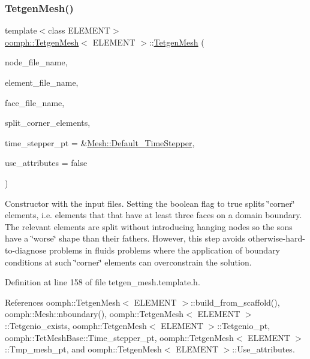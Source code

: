 \subsubsection{\texorpdfstring{Tetgen\+Mesh()}{TetgenMesh()}\hspace{0.1cm}{\footnotesize\ttfamily [4/6]}}
{\footnotesize\ttfamily template$<$class E\+L\+E\+M\+E\+NT$>$ \\
\hyperlink{classoomph_1_1TetgenMesh}{oomph\+::\+Tetgen\+Mesh}$<$ E\+L\+E\+M\+E\+NT $>$\+::\hyperlink{classoomph_1_1TetgenMesh}{Tetgen\+Mesh} (\begin{DoxyParamCaption}\item[{const std\+::string \&}]{node\+\_\+file\+\_\+name,  }\item[{const std\+::string \&}]{element\+\_\+file\+\_\+name,  }\item[{const std\+::string \&}]{face\+\_\+file\+\_\+name,  }\item[{const bool \&}]{split\+\_\+corner\+\_\+elements,  }\item[{\hyperlink{classoomph_1_1TimeStepper}{Time\+Stepper} $\ast$}]{time\+\_\+stepper\+\_\+pt = {\ttfamily \&\hyperlink{classoomph_1_1Mesh_a12243d0fee2b1fcee729ee5a4777ea10}{Mesh\+::\+Default\+\_\+\+Time\+Stepper}},  }\item[{const bool \&}]{use\+\_\+attributes = {\ttfamily false} }\end{DoxyParamCaption})\hspace{0.3cm}{\ttfamily [inline]}}



Constructor with the input files. Setting the boolean flag to true splits \char`\"{}corner\char`\"{} elements, i.\+e. elements that that have at least three faces on a domain boundary. The relevant elements are split without introducing hanging nodes so the sons have a \char`\"{}worse\char`\"{} shape than their fathers. However, this step avoids otherwise-\/hard-\/to-\/diagnose problems in fluids problems where the application of boundary conditions at such \char`\"{}corner\char`\"{} elements can overconstrain the solution. 



Definition at line 158 of file tetgen\+\_\+mesh.\+template.\+h.



References oomph\+::\+Tetgen\+Mesh$<$ E\+L\+E\+M\+E\+N\+T $>$\+::build\+\_\+from\+\_\+scaffold(), oomph\+::\+Mesh\+::nboundary(), oomph\+::\+Tetgen\+Mesh$<$ E\+L\+E\+M\+E\+N\+T $>$\+::\+Tetgenio\+\_\+exists, oomph\+::\+Tetgen\+Mesh$<$ E\+L\+E\+M\+E\+N\+T $>$\+::\+Tetgenio\+\_\+pt, oomph\+::\+Tet\+Mesh\+Base\+::\+Time\+\_\+stepper\+\_\+pt, oomph\+::\+Tetgen\+Mesh$<$ E\+L\+E\+M\+E\+N\+T $>$\+::\+Tmp\+\_\+mesh\+\_\+pt, and oomph\+::\+Tetgen\+Mesh$<$ E\+L\+E\+M\+E\+N\+T $>$\+::\+Use\+\_\+attributes.

